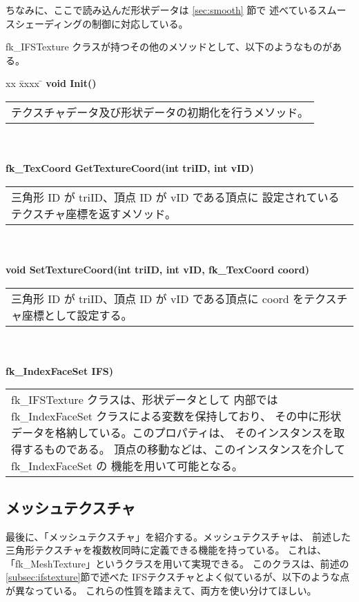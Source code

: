 ちなみに、ここで読み込んだ形状データは \ref{sec:smooth} 節で
述べているスムースシェーディングの制御に対応している。

fk\_IFSTexture クラスが持つその他のメソッドとして、以下のようなものがある。
\begin{tabbing}
xx \= xxxx \= \kill
\> \textbf{void Init()} \\
	\> \> \begin{tabular}{p{15cm}}
		テクスチャデータ及び形状データの初期化を行うメソッド。
	\end{tabular} \\ \\

\> \textbf{fk\_TexCoord GetTextureCoord(int triID, int vID)} \\
	\> \> \begin{tabular}{p{15cm}}
		三角形 ID が triID、頂点 ID が vID である頂点に
		設定されているテクスチャ座標を返すメソッド。
	\end{tabular} \\ \\

\> \textbf{void SetTextureCoord(int triID, int vID, fk\_TexCoord coord)} \\
	\> \> \begin{tabular}{p{15cm}}
		三角形 ID が triID、頂点 ID が vID である頂点に
		coord をテクスチャ座標として設定する。
	\end{tabular} \\ \\

\> \textbf{fk\_IndexFaceSet IFS)} \\
	\> \> \begin{tabular}{p{15cm}}
		fk\_IFSTexture クラスは、形状データとして
		内部では fk\_IndexFaceSet クラスによる変数を保持しており、
		その中に形状データを格納している。このプロパティは、
		そのインスタンスを取得するものである。
		頂点の移動などは、このインスタンスを介して fk\_IndexFaceSet の
		機能を用いて可能となる。
	\end{tabular}
\end{tabbing}

\subsection{メッシュテクスチャ}
最後に、「メッシュテクスチャ」を紹介する。メッシュテクスチャは、
前述した三角形テクスチャを複数枚同時に定義できる機能を持っている。
これは、「fk\_MeshTexture」というクラスを用いて実現できる。
このクラスは、前述の \ref{subsec:ifstexture}節で述べた
IFSテクスチャとよく似ているが、以下のような点が異なっている。
これらの性質を踏まえて、両方を使い分けてほしい。

